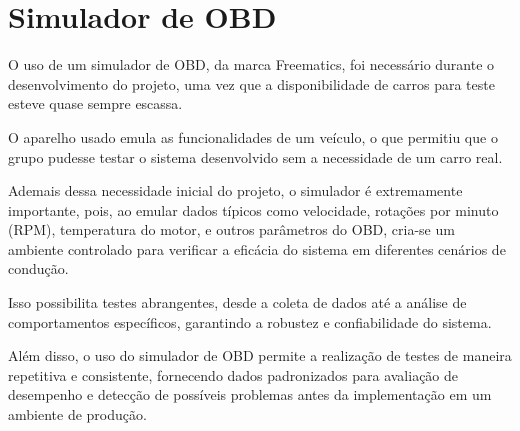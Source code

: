 \section{Simulador de OBD}
O uso de um simulador de OBD, da marca Freematics, foi necessário durante o desenvolvimento do projeto, uma vez que a disponibilidade de carros para teste esteve quase sempre escassa.

O aparelho usado emula as funcionalidades de um veículo, o que permitiu que o grupo pudesse testar o sistema desenvolvido sem a necessidade de um carro real.

Ademais dessa necessidade inicial do projeto, o simulador é extremamente importante, pois, ao emular dados típicos como velocidade, rotações por minuto (RPM), temperatura do motor, e outros parâmetros do OBD, cria-se um ambiente controlado para verificar a eficácia do sistema em diferentes cenários de condução. 

Isso possibilita testes abrangentes, desde a coleta de dados até a análise de comportamentos específicos, garantindo a robustez e confiabilidade do sistema.

Além disso, o uso do simulador de OBD permite a realização de testes de maneira repetitiva e consistente, fornecendo dados padronizados para avaliação de desempenho e detecção de possíveis problemas antes da implementação em um ambiente de produção. 